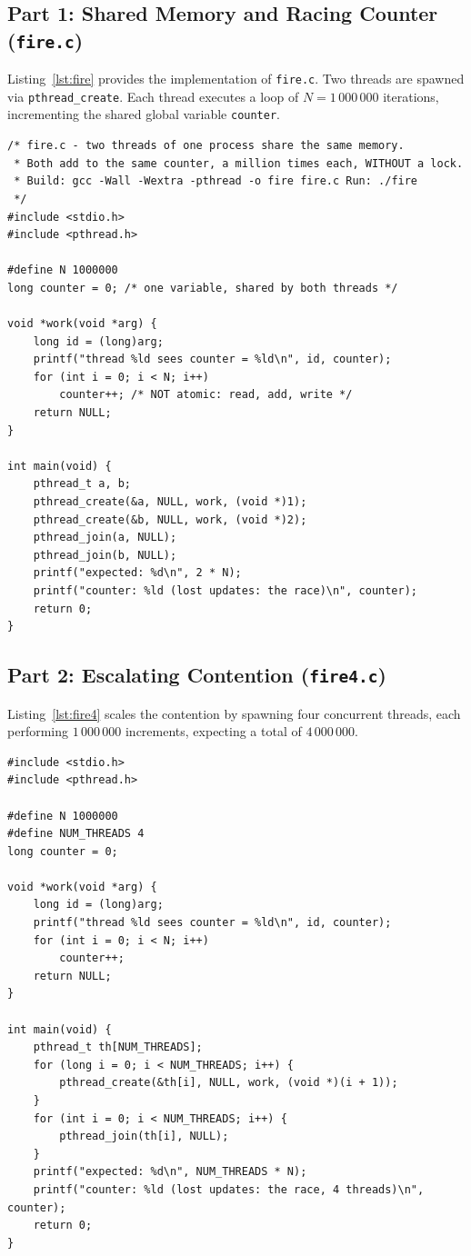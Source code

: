 \documentclass[12pt,a4paper]{article}
\begin{document}
\subsection{Part 1: Shared Memory and Racing Counter (\texttt{fire.c})}
Listing~\ref{lst:fire} provides the implementation of \texttt{fire.c}. Two threads are spawned via \texttt{pthread\_create}. Each thread executes a loop of $N = 1\,000\,000$ iterations, incrementing the shared global variable \texttt{counter}.

\begin{lstlisting}[style=cstyle, caption={Unsynchronized Two-Thread Racing Counter (\texttt{fire.c})}, label={lst:fire}]
/* fire.c - two threads of one process share the same memory.
 * Both add to the same counter, a million times each, WITHOUT a lock.
 * Build: gcc -Wall -Wextra -pthread -o fire fire.c Run: ./fire
 */
#include <stdio.h>
#include <pthread.h>

#define N 1000000
long counter = 0; /* one variable, shared by both threads */

void *work(void *arg) {
    long id = (long)arg;
    printf("thread %ld sees counter = %ld\n", id, counter);
    for (int i = 0; i < N; i++)
        counter++; /* NOT atomic: read, add, write */
    return NULL;
}

int main(void) {
    pthread_t a, b;
    pthread_create(&a, NULL, work, (void *)1);
    pthread_create(&b, NULL, work, (void *)2);
    pthread_join(a, NULL);
    pthread_join(b, NULL);
    printf("expected: %d\n", 2 * N);
    printf("counter: %ld (lost updates: the race)\n", counter);
    return 0;
}
\end{lstlisting}

\subsection{Part 2: Escalating Contention (\texttt{fire4.c})}
Listing~\ref{lst:fire4} scales the contention by spawning four concurrent threads, each performing $1\,000\,000$ increments, expecting a total of $4\,000\,000$.

\begin{lstlisting}[style=cstyle, caption={Four-Thread Contention Benchmark (\texttt{fire4.c})}, label={lst:fire4}]
#include <stdio.h>
#include <pthread.h>

#define N 1000000
#define NUM_THREADS 4
long counter = 0;

void *work(void *arg) {
    long id = (long)arg;
    printf("thread %ld sees counter = %ld\n", id, counter);
    for (int i = 0; i < N; i++)
        counter++;
    return NULL;
}

int main(void) {
    pthread_t th[NUM_THREADS];
    for (long i = 0; i < NUM_THREADS; i++) {
        pthread_create(&th[i], NULL, work, (void *)(i + 1));
    }
    for (int i = 0; i < NUM_THREADS; i++) {
        pthread_join(th[i], NULL);
    }
    printf("expected: %d\n", NUM_THREADS * N);
    printf("counter: %ld (lost updates: the race, 4 threads)\n", counter);
    return 0;
}
\end{lstlisting}
\end{document}
